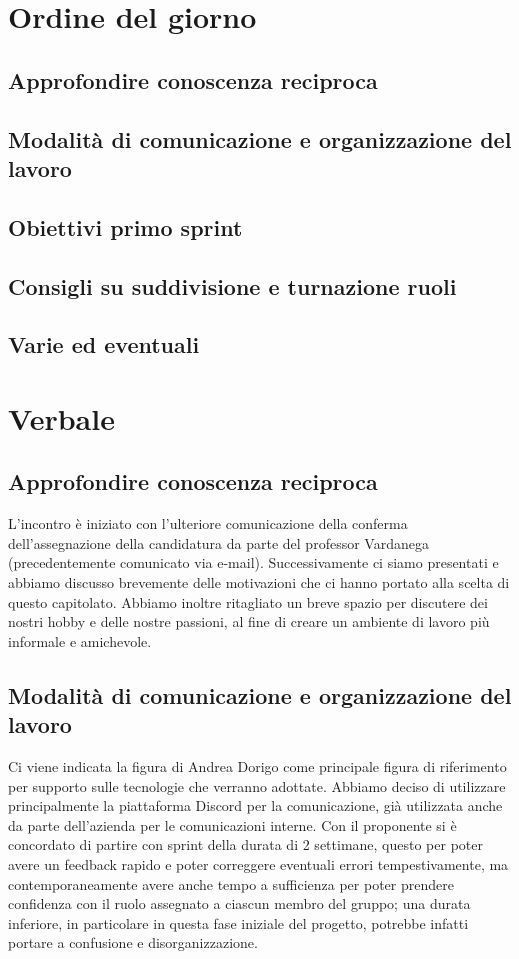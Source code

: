 \documentclass[italian,12pt]{article}
\begin{document}
\section{Ordine del giorno}
\subsection{Approfondire conoscenza reciproca}
\subsection{Modalità di comunicazione e organizzazione del lavoro}
\subsection{Obiettivi primo sprint}
\subsection{Consigli su suddivisione e turnazione ruoli}
\subsection{Varie ed eventuali}

\newpage

\section{Verbale}

\subsection{Approfondire conoscenza reciproca}
L'incontro è iniziato con l'ulteriore comunicazione della conferma dell'assegnazione della candidatura da parte del professor Vardanega (precedentemente comunicato via e-mail). Successivamente ci siamo presentati e abbiamo discusso brevemente delle motivazioni che ci hanno portato alla scelta di questo capitolato. Abbiamo inoltre ritagliato un breve spazio per discutere dei nostri hobby e delle nostre passioni, al fine di creare un ambiente di lavoro più informale e amichevole.

\subsection{Modalità di comunicazione e organizzazione del lavoro}
Ci viene indicata la figura di Andrea Dorigo come principale figura di riferimento per supporto sulle tecnologie che verranno adottate. Abbiamo deciso di utilizzare principalmente la piattaforma Discord per la comunicazione, già utilizzata anche da parte dell'azienda per le comunicazioni interne. Con il proponente si è concordato di partire con sprint della durata di 2 settimane, questo per poter avere un feedback rapido e poter correggere eventuali errori tempestivamente, ma contemporaneamente avere anche tempo a sufficienza per poter prendere confidenza con il ruolo assegnato a ciascun membro del gruppo; una durata inferiore, in particolare in questa fase iniziale del progetto, potrebbe infatti portare a confusione e disorganizzazione.
\end{document}
